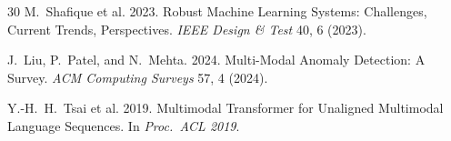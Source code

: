 \documentclass[sigconf,nonacm]{acmart}
\begin{document}
\begin{thebibliography}{30}
M.~Shafique et al. 2023. Robust Machine Learning Systems:
Challenges, Current Trends, Perspectives. \textit{IEEE Design
\& Test} 40, 6 (2023).

J.~Liu, P.~Patel, and N.~Mehta. 2024. Multi-Modal Anomaly
Detection: A Survey. \textit{ACM Computing Surveys} 57, 4 (2024).

Y.-H.~H.~Tsai et al. 2019. Multimodal Transformer for Unaligned
Multimodal Language Sequences. In \textit{Proc.\ ACL 2019}.

\end{thebibliography}
\end{document}
